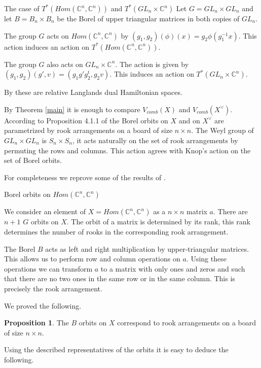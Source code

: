 \documentclass[12pt]{article}
\newcommand{\C}{\mathbb{C}}
\theoremstyle{plain}
\theoremstyle{definition}
\newtheorem{prop}[theorem]{Proposition}
\begin{document}
\begin{subsection}{The case of $T^*(Hom(\C^n,\C^n))$ and $T^*(GL_n\times \C^n)$}
    Let $G=GL_n\times GL_n$ and let $B=B_n\times B_n$ be the Borel of upper triangular matrices in both copies of $GL_n$. 

    The group $G$ acts on $Hom(\C^n,\C^n)$ by $(g_1,g_2)(\phi)(x)=g_2\phi(g_1^{-1}x)$. This action induces an action on $T^*(Hom(\C^n,\C^n))$.

    The group $G$ also acts on $GL_n\times \C^n$. The action is given by $(g_1,g_2)(g',v)=(g_1g'g_2^t,g_2v)$. This induces an action on $T^*(GL_n\times \C^n)$.

    By \cite{benzvi2024relativelanglandsduality} these are relative Langlands dual Hamiltonian spaces.

    By Theorem \ref{main} it is enough to compare $V_{comb}(X)$ and $V_{comb}(X^\vee)$. According to Proposition 4.1.1 of \cite{FGT} the Borel orbits on $X$ and on $X^\vee$ are parametrized by rook arrangements on a board of size $n\times n$. The Weyl group of $GL_n\times GL_n$ is $S_n\times S_n$, it acts naturally on the set of rook arrangements by permuting the rows and columns. This action agrees with Knop's action on the set of Borel orbits.

    For completeness we reprove some of the results of \cite{FGT}.

    \begin{subsubsection}{Borel orbits on $Hom(\C^n,\C^n)$}

    We consider an element of $X=Hom(\C^n,\C^n)$ as a $n\times n$ matrix $a$. There are $n+1$ $G$ orbits on $X$. The orbit of a matrix is determined by its rank, this rank determines the number of rooks in the corresponding rook arrangement.

    The Borel $B$ acts as left and right multiplication by upper-triangular matrices. This allows us to perform row and column operations on $a$. Using these operations we can transform $a$ to a matrix with only ones and zeros and such that there are no two ones in the same row or in the same column. This is precisely the rook arrangement. 

    We proved the following.

    \begin{prop}
        The $B$ orbits on $X$ correspond to rook arrangements on a board of size $n\times n$.
    \end{prop}

    Using the described representatives of the orbits it is easy to deduce the following.


\end{subsubsection}
\end{subsection}
\end{document}
